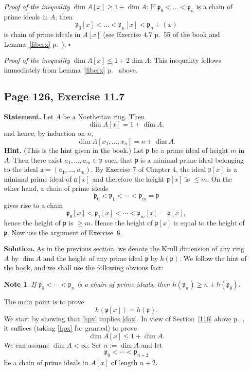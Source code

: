 \documentclass[parskip=half,fontsize=12pt]{scrartcl}%
\newcommand{\mf}{\mathfrak}
\newcommand{\aaa}{\mf a}
\newcommand{\ppp}{\mf p}
\newtheorem{note}[thm]{Note}
\begin{document}
\emph{Proof of the inequality} $\dim A[x]\ge1+\dim A$: If 
$
\ppp_0<\dots<\ppp_n
$ 
is a chain of prime ideals in $A$, then 
$$
\ppp_0[x]<\dots<\ppp_n[x]<\ppp_n+(x)
$$ 
is chain of prime ideals in $A[x]$ (see Exercise 4.7 p.~55 of the book and Lemma~\ref{fiberx} p.~\pageref{fiberx}). $\square$

\emph{Proof of the inequality} $\dim A[x]\le1+2\dim A$: This inequality follows immediately from Lemma~\ref{fiberx} p.~\pageref{fiberx} above.

\subsection{Page 126, Exercise 11.7}%

\textbf{Statement.} Let $A$ be a Noetherian ring. Then
\begin{equation}\label{dax}
\dim A[x]=1+\dim A,
\end{equation}
and hence, by induction on $n$,
$$
\dim A[x_1,\ldots,x_n]=n+\dim A.
$$ 
\textbf{Hint.} (This is the hint given in the book.) Let $\ppp$ be a prime ideal of height $m$ in $A$. Then there exist $a_1,\ldots,a_m\in\ppp$ such that $\ppp$ is a minimal prime ideal belonging to the ideal $\aaa=(a_1,\ldots,a_m)$. By Exercise 7 of Chapter 4, the ideal $\ppp[x]$ is a minimal prime ideal of $\aaa[x]$ and therefore the height $\ppp[x]$ is $\le m$. On the other hand, a chain of prime ideals 
$$
\ppp_0<\ppp_1<\cdots<\ppp_m=\ppp
$$ 
gives rise to a chain 
$$
\ppp_0[x]<\ppp_1[x]<\cdots<\ppp_m[x]=\ppp[x],
$$ 
hence the height of $\ppp$ is $\ge m$. Hence the height of $\ppp[x]$ is equal to the height of $\ppp$. Now use the argument of Exercise~6.

\textbf{Solution.} As in the previous section, we denote the Krull dimension of any ring $A$ by $\dim A$ and the height of any prime ideal $\ppp$ by $h(\ppp)$. We follow the hint of the book, and we shall use the following obvious fact: 

\begin{note}\label{116a}
If $\ppp_0<\cdots<\ppp_n$ is a chain of prime ideals, then $h(\ppp_n)\ge n+h(\ppp_0)$. 
\end{note}

The main point is to prove 
\begin{equation}\label{hpx}
h(\ppp[x])=h(\ppp).
\end{equation}
We start by showing that \eqref{hpx} implies \eqref{dax}. In view of Section~\ref{116} above p.~\pageref{116}, it suffices (taking \eqref{hpx} for granted) to prove 
$$
\dim A[x]\le1+\dim A.
$$ 
We can assume $\dim A<\infty$. Set $n:=\dim A$ and let 
$$ 
\ppp_0<\cdots<\ppp_{n+2}
$$ 
be a chain of prime ideals in $A[x]$ of length $n+2$. 
\end{document}
